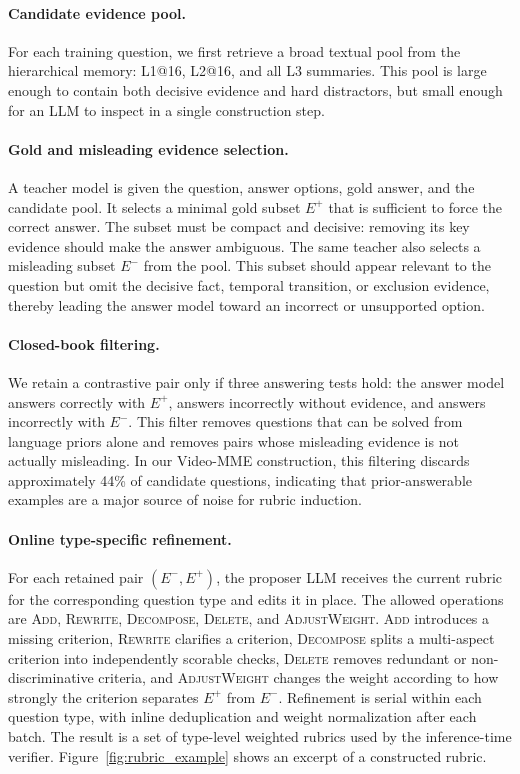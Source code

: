 \documentclass[letterpaper]{article} %
\begin{document}
\paragraph{Candidate evidence pool.}
For each training question, we first retrieve a broad textual pool from the hierarchical memory: L1@16, L2@16, and all L3 summaries. This pool is large enough to contain both decisive evidence and hard distractors, but small enough for an LLM to inspect in a single construction step.

\paragraph{Gold and misleading evidence selection.}
A teacher model is given the question, answer options, gold answer, and the candidate pool. It selects a minimal gold subset $E^{+}$ that is sufficient to force the correct answer. The subset must be compact and decisive: removing its key evidence should make the answer ambiguous. The same teacher also selects a misleading subset $E^{-}$ from the pool. This subset should appear relevant to the question but omit the decisive fact, temporal transition, or exclusion evidence, thereby leading the answer model toward an incorrect or unsupported option.

\paragraph{Closed-book filtering.}
We retain a contrastive pair only if three answering tests hold: the answer model answers correctly with $E^{+}$, answers incorrectly without evidence, and answers incorrectly with $E^{-}$. This filter removes questions that can be solved from language priors alone and removes pairs whose misleading evidence is not actually misleading. In our Video-MME construction, this filtering discards approximately 44\% of candidate questions, indicating that prior-answerable examples are a major source of noise for rubric induction.

\paragraph{Online type-specific refinement.}
For each retained pair $(E^{-},E^{+})$, the proposer LLM receives the current rubric for the corresponding question type and edits it in place. The allowed operations are \textsc{Add}, \textsc{Rewrite}, \textsc{Decompose}, \textsc{Delete}, and \textsc{AdjustWeight}. \textsc{Add} introduces a missing criterion, \textsc{Rewrite} clarifies a criterion, \textsc{Decompose} splits a multi-aspect criterion into independently scorable checks, \textsc{Delete} removes redundant or non-discriminative criteria, and \textsc{AdjustWeight} changes the weight according to how strongly the criterion separates $E^{+}$ from $E^{-}$. Refinement is serial within each question type, with inline deduplication and weight normalization after each batch. The result is a set of type-level weighted rubrics used by the inference-time verifier. Figure~\ref{fig:rubric_example} shows an excerpt of a constructed rubric.
\end{document}

